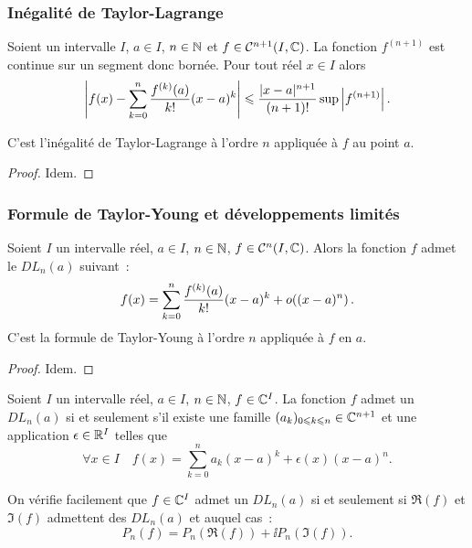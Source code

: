 \subsubsection{Inégalité de Taylor-Lagrange}

\begin{theo}
  Soient un intervalle \(I\), \(a \in I\), \(n \in \mathbb{N}\) et \(f \in 
  \mathcal{C}^{{n+1}} (I,\mathbb{C})\). La fonction \(f^{(n+1)}\) est continue sur un segment 
  donc bornée. Pour tout réel \(x \in I\) alors
  \begin{equation}
    \left|f(x)-\sum_{k = 0}^n \frac{f^{(k)}(a)}{k!}(x-a)^k\right| \leqslant 
    \frac{|x-a|^{n+1}}{(n+1)!} \sup \left\lvert f^{(n+1)}\right\rvert.
  \end{equation}

  C'est l'inégalité de Taylor-Lagrange à l'ordre \(n\) appliquée à \(f\) au 
  point \(a\).
\end{theo}
\begin{proof}
  Idem.
\end{proof}

\subsubsection{Formule de Taylor-Young et développements limités}

\begin{theo}
  Soient \(I\) un intervalle réel, \(a \in I\), \(n \in \mathbb{N}\), \(f \in 
  \mathcal{C}^{n}(I,\mathbb{C})\). Alors la fonction \(f\) admet le \(DL_n(a)\) suivant~:
  \begin{equation}
    f(x) = \sum_{k = 0}^n \frac{f^{(k)}(a)}{k!} (x-a)^k + o\mathopen{}\left((x-a)^n\right).
  \end{equation}
  C'est la formule de Taylor-Young à l'ordre \(n\) appliquée à \(f\) en \(a\).
\end{theo}
\begin{proof}
  Idem.
\end{proof}

\begin{defdef}
  Soient \(I\) un intervalle réel, \(a \in I\), \(n \in \mathbb{N}\), \(f \in \mathbb{C}^I\). La 
  fonction \(f\) admet un \(DL_n(a)\) si et seulement s'il existe une famille 
  \((a_k)_{0\leqslant k\leqslant n} \in \mathbb{C}^{n+1}\) et une application \(\epsilon 
  \in \mathbb{R}^I\) telles que
  \begin{equation}
    \forall x \in I \quad f(x) = \sum_{k = 0}^n a_k (x-a)^k + \epsilon(x)(x-a)^n.
  \end{equation}

  On vérifie facilement que \(f\in \mathbb{C}^I\) admet un \(DL_n(a)\) si et seulement 
  si \(\Re(f)\) et \(\Im(f)\) admettent des \(DL_n(a)\) et auquel cas~:
  \begin{equation}
    P_n(f) = P_n(\Re(f)) + \ii P_n(\Im(f)).
  \end{equation}
\end{defdef}
